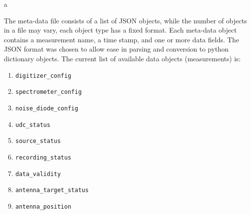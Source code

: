 a\documentclass[a4paper,14pt]{article}
\begin{document}
The meta-data file consists of a list of JSON objects, while the number of objects in a file may vary, each object type has a fixed format. Each meta-data object contains a measurement name, a time stamp, and one or more data fields. 
The JSON format was chosen to allow ease in parsing and conversion to python dictionary objects. The current list of available data objects (measurements) is:

\begin{enumerate}
  \item \verb|digitizer_config|
  \item \verb|spectrometer_config|
  \item \verb|noise_diode_config|
  \item \verb|udc_status|
  \item \verb|source_status|
  \item \verb|recording_status|
  \item \verb|data_validity|
  \item \verb|antenna_target_status|
  \item \verb|antenna_position|
\end{enumerate}
\end{document}

